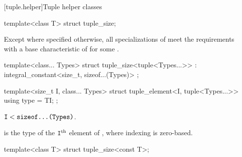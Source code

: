 [tuple.helper]{Tuple helper classes}

%
\begin{itemdecl}
template<class T> struct tuple_size;
\end{itemdecl}

\begin{itemdescr}
\pnum
Except where specified otherwise,
all specializations of  meet the
 requirements with a
base characteristic of 
for some .
\end{itemdescr}

%
\begin{itemdecl}
template<class... Types>
  struct tuple_size<tuple<Types...>> : integral_constant<size_t, sizeof...(Types)> { };
\end{itemdecl}

%
\begin{itemdecl}
template<size_t I, class... Types>
  struct tuple_element<I, tuple<Types...>> {
    using type = TI;
  };
\end{itemdecl}

\begin{itemdescr}
\pnum
\mandates
$\texttt{\protect I} < \texttt{\protect sizeof...(Types)}$.

\pnum
\ctype
{} is the
type of the $\texttt{\protect I}^\text{th}$ element of ,
where indexing is zero-based.
\end{itemdescr}

%
\begin{itemdecl}
template<class T> struct tuple_size<const T>;
\end{itemdecl}

